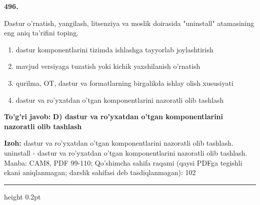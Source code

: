 \documentclass[10pt,a4paper]{article}
\begin{document}
{\bfseries\sffamily\color{ink} 496.}
\par
Dastur o'rnatish, yangilash, litsenziya va moslik doirasida "uninstall" atamasining eng aniq ta'rifini toping.
\begin{enumerate}[label=\Alph*),leftmargin=9mm]
\item dastur komponentlarini tizimda ishlashga tayyorlab joylashtirish
\item mavjud versiyaga tuzatish yoki kichik yaxshilanish o'rnatish
\item qurilma, OT, dastur va formatlarning birgalikda ishlay olish xususiyati
\item dastur va ro'yxatdan o'tgan komponentlarini nazoratli olib tashlash
\end{enumerate}
\begin{tcolorbox}[enhanced,breakable,colback=teal!4,colframe=teal!60!black,boxrule=0.45pt,arc=1.2mm,left=2.7mm,right=2.7mm,top=1.8mm,bottom=1.8mm,before skip=2mm,after skip=2mm]
{\bfseries\sffamily\color{teal}To'g'ri javob:} \textbf{D) dastur va ro'yxatdan o'tgan komponentlarini nazoratli olib tashlash}
\par\smallskip
{\bfseries Izoh:} dastur va ro'yxatdan o'tgan komponentlarini nazoratli olib tashlash. uninstall - dastur va ro'yxatdan o'tgan komponentlarini nazoratli olib tashlash. Manba: CAM8, PDF 99-110; Qo'shimcha sahifa raqami (qaysi PDFga tegishli ekani aniqlanmagan; darslik sahifasi deb tasdiqlanmagan): 102
\end{tcolorbox}
\vspace{2mm}\hrule height 0.2pt\vspace{3mm}
\end{document}
